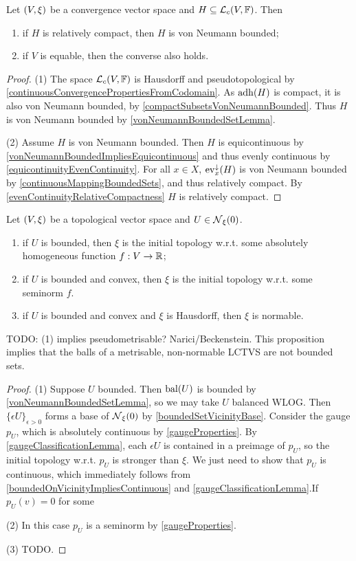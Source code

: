 \begin{proposition}
Let $\sSet{V,\xi}$ be a convergence vector space and $H\subseteq \operatorname{\mathcal{L}}_c(V, \mathbb{F})$. Then
\begin{enumerate}
\item if $H$ is relatively compact, then $H$ is von Neumann bounded;
\item if $V$ is equable, then the converse also holds.
\end{enumerate}
\end{proposition}
\begin{proof}
(1) The space $\operatorname{\mathcal{L}}_c(V, \mathbb{F})$ is Hausdorff and pseudotopological by \ref{continuousConvergencePropertiesFromCodomain}. As $\operatorname{adh}(H)$ is compact, it is also von Neumann bounded, by \ref{compactSubsetsVonNeumannBounded}. Thus $H$ is von Neumann bounded by \ref{vonNeumannBoundedSetLemma}.

(2) Assume $H$ is von Neumann bounded. Then $H$ is equicontinuous by \ref{vonNeumannBoundedImpliesEquicontinuous} and thus evenly continuous by \ref{equicontinuityEvenContinuity}. For all $x\in X$, $\operatorname{ev}_x^\downarrow(H)$ is von Neumann bounded by \ref{continuousMappingBoundedSets}, and thus relatively compact. By \ref{evenContinuityRelativeCompactness} $H$ is relatively compact.
\end{proof}

\begin{proposition}
Let $\sSet{V,\xi}$ be a topological vector space and $U\in\operatorname{\mathcal{N}}_\xi(0)$.
\begin{enumerate}
\item if $U$ is bounded, then $\xi$ is the initial topology w.r.t. some absolutely homogeneous function $f: V\to \mathbb{R}$;
\item if $U$ is bounded and convex, then $\xi$ is the initial topology w.r.t. some seminorm $f$.
\item if $U$ is bounded and convex and $\xi$ is Hausdorff, then $\xi$ is normable.
\end{enumerate}
\end{proposition}
TODO: (1) implies pseudometrisable? Narici/Beckenstein.
This proposition implies that the balls of a metrisable, non-normable LCTVS are not bounded sets.
\begin{proof}
(1) Suppose $U$ bounded. Then $\operatorname{bal}(U)$ is bounded by \ref{vonNeumannBoundedSetLemma}, so we may take $U$ balanced WLOG. Then $\{\epsilon U\}_{\epsilon >0}$ forms a base of $\operatorname{\mathcal{N}}_\xi(0)$ by \ref{boundedSetVicinityBase}. Consider the gauge $p_U$, which is absolutely continuous by \ref{gaugeProperties}. By \ref{gaugeClassificationLemma}, each $\epsilon U$ is contained in a preimage of $p_U$, so the initial topology w.r.t. $p_U$ is stronger than $\xi$. We just need to show that $p_U$ is continuous, which immediately follows from \ref{boundedOnVicinityImpliesContinuous} and \ref{gaugeClassificationLemma}.If $p_U(v) = 0$ for some 

(2) In this case $p_U$ is a seminorm by \ref{gaugeProperties}.

(3) TODO.
\end{proof}

